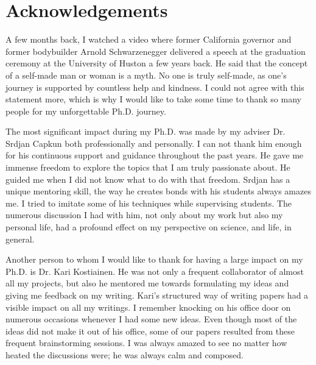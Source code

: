 
\bigskip

\begingroup
\let\clearpage\relax
\let\cleardoublepage\relax
\let\cleardoublepage\relax
\chapter*{Acknowledgements}

\def\thanks#1{%
\begingroup
\leftskip1em
\noindent #1
\par
\endgroup
}

A few months back, I watched a video where former California governor and former bodybuilder Arnold Schwarzenegger delivered a speech at the graduation ceremony at the University of Huston a few years back. He said that the concept of a self-made man or woman is a myth. No one is truly self-made, as one's journey is supported by countless help and kindness. I could not agree with this statement more, which is why I would like to take some time to thank so many people for my unforgettable Ph.D. journey.


The most significant impact during my Ph.D. was made by my adviser Dr. Srdjan Capkun both professionally and personally. I can not thank him enough for his continuous support and guidance throughout the past years. He gave me immense freedom to explore the topics that I am truly passionate about. He guided me when I did not know what to do with that freedom. Srdjan has a unique mentoring skill, the way he creates bonds with his students always amazes me. I tried to imitate some of his techniques while supervising students. The numerous discussion I had with him, not only about my work but also my personal life, had a profound effect on my perspective on science, and life, in general.


Another person to whom I would like to thank for having a large impact on my Ph.D. is Dr. Kari Kostiainen. He was not only a frequent collaborator of almost all my projects, but also he mentored me towards formulating my ideas and giving me feedback on my writing.  Kari's structured way of writing papers had a visible impact on all my writings. I remember knocking on his office door on numerous occasions whenever I had some new ideas. Even though most of the ideas did not make it out of his office, some of our papers resulted from these frequent brainstorming sessions. I was always amazed to see no matter how heated the discussions were; he was always calm and composed.


